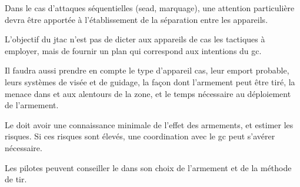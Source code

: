 Dans le cas d'attaques séquentielles (\gls{sead}, marquage), une attention particulière devra être apportée à l'établissement de la séparation entre les appareils.

L'objectif du \gls{jtac} n'est pas de dicter aux appareils de \gls{cas} les tactiques à employer, mais de fournir un plan qui correspond aux intentions du \gls{gc}.

\begin{e1}
	
	
	
	Il faudra aussi prendre en compte le type d'appareil \gls{cas}, leur emport probable, leurs systèmes de visée et de guidage, la façon dont l'armement peut être tiré, la menace dans et aux alentours de la zone,  et le temps nécessaire au déploiement de l'armement.
	
	Le \ja{} doit avoir une connaissance minimale de l'effet des armements, et estimer les risques. Si ces risques sont élevés, une coordination avec le \gls{gc} peut s'avérer nécessaire.
	
	Les pilotes peuvent conseiller le \ja{} dans son choix de l'armement et de la méthode de tir.
	
	
	

\end{e1}
